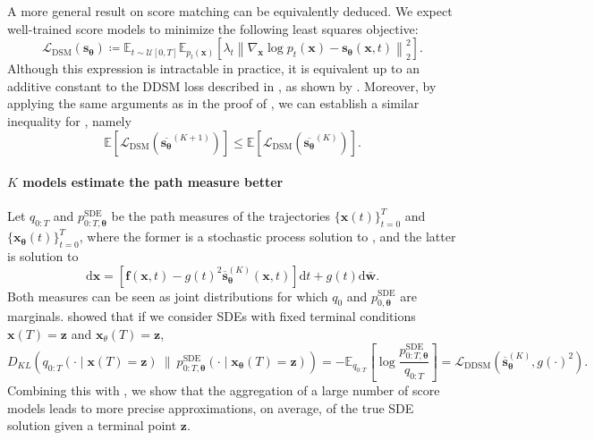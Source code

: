\documentclass[10pt]{article} %
\newcommand{\SDE}{\text{SDE}}
\newcommand{\DSM}{\text{DSM}}
\newcommand{\DDSM}{\text{DDSM}}
\def\rvw{{\mathbf{w}}}
\def\rvx{{\mathbf{x}}}
\def\rvz{{\mathbf{z}}}
\def\vtheta{{\bm{\theta}}}
\def\vs{{\bm{s}}}
\begin{document}
A more general result on score matching can be equivalently deduced. We expect well-trained score models to minimize the following least squares objective:
\begin{equation}\label{eq: score_matching_original}
\mathcal{L}_{\DSM}(\vs_\vtheta) \coloneqq \mathbb{E}_{t \sim \mathcal{U}[0, T]} \mathbb{E}_{p_t(\rvx)} \left[ \lambda_t \left\| \nabla_{\rvx} \log p_t(\rvx) - \vs_{\vtheta}(\rvx, t) \right\|_2^2 \right].
\end{equation}
Although this expression is intractable in practice, it is equivalent up to an additive constant to the DDSM loss described in , as shown by \citet{vincent2011connection}. Moreover, by applying the same arguments as in the proof of , we can establish a similar inequality for , namely
\begin{equation}\label{eq: inequality general score matching}
\mathbb{E}\left[ \mathcal{L}_{\DSM}(\overline{\vs_\vtheta}^{(K+1)}) \right] \leq \mathbb{E}\left[ \mathcal{L}_{\DSM}(\overline{\vs_\vtheta}^{(K)}) \right].
\end{equation}




\paragraph{$K$ models estimate the path measure better} 

Let $q_{0:T}$ and $p^\SDE_{0:T,\vtheta}$ be the path measures of the trajectories $\{\rvx(t)\}_{t=0}^T$ and $\{\rvx_\vtheta(t)\}_{t=0}^T$, where the former is a stochastic process solution to , and the latter is solution to
\begin{equation}
\mathrm{d}\rvx = [\mathbf{f}(\rvx,t) - g(t)^2 \overline{\vs}_\vtheta^{(K)}(\rvx,t)]\mathrm{d}t + g(t)\mathrm{d}\bar{\rvw}.
\end{equation}
Both measures can be seen as joint distributions for which $q_0$ and $p^\SDE_{0,\vtheta}$ are marginals. 
\citet{lu2022maximum} showed that if we consider SDEs with fixed terminal conditions $\rvx(T) = \rvz$ and $\rvx_\theta(T) = \rvz$,  
\begin{equation}
D_{KL}(q_{0:T}(\cdot \mid \rvx(T) = \rvz) \ \| \ p^\SDE_{0:T,\vtheta}(\cdot \mid \rvx_\vtheta(T) = \rvz)) = - \mathbb{E}_{q_{0:T}}\left[\log \frac{p^\SDE_{0:T,\vtheta}}{q_{0:T}}\right] = \mathcal{L}_{\DDSM}(\overline{\vs}_\vtheta^{(K)},g(\cdot)^2).
\end{equation}
Combining this with , we show that the aggregation of a large number of score models leads to more precise approximations, on average, of the true SDE solution given a terminal point $\rvz$.
\end{document}
